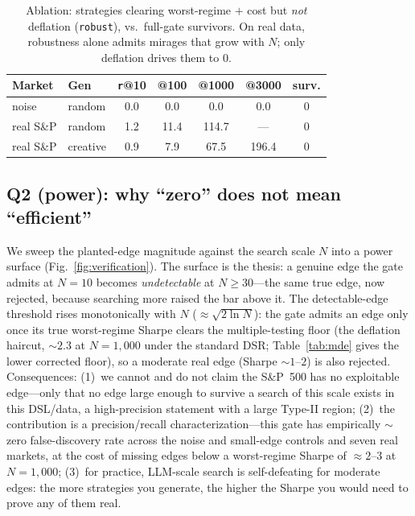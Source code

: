\documentclass[sigconf]{acmart}
\begin{document}
\begin{table}[t]
\caption{Ablation: strategies clearing worst-regime $+$ cost but \emph{not} deflation (\texttt{robust}), vs.\ full-gate survivors. On real data, robustness alone admits mirages that grow with $N$; only deflation drives them to 0.}
\label{tab:ablation}
\small
\begin{tabular}{@{}llccccc@{}}
\toprule
Market & Gen & \texttt{r}@10 & @100 & @1000 & @3000 & surv. \\
\midrule
noise & random & 0.0 & 0.0 & 0.0 & 0.0 & 0 \\
real S\&P & random & 1.2 & 11.4 & 114.7 & --- & 0 \\
real S\&P & creative & 0.9 & 7.9 & 67.5 & 196.4 & 0 \\
\bottomrule
\end{tabular}
\end{table}

\subsection{Q2 (power): why ``zero'' does not mean ``efficient''}
\label{sec:power}
We sweep the planted-edge magnitude against the search scale $N$ into a power surface (Fig.~\ref{fig:verification}). The surface is the thesis: a genuine edge the gate admits at $N{=}10$ becomes \emph{undetectable} at $N\ge30$---the same true edge, now rejected, because searching more raised the bar above it. The detectable-edge threshold rises monotonically with $N$ (${\approx}\sqrt{2\ln N}$): the gate admits an edge only once its true worst-regime Sharpe clears the multiple-testing floor (the deflation haircut, ${\sim}2.3$ at $N{=}1{,}000$ under the standard DSR; Table~\ref{tab:mde} gives the lower corrected floor), so a moderate real edge (Sharpe ${\sim}1$--$2$) is also rejected. Consequences: (1)~we cannot and do not claim the S\&P~500 has no exploitable edge---only that no edge large enough to survive a search of this scale exists in this DSL/data, a high-precision statement with a large Type-II region; (2)~the contribution is a precision/recall characterization---this gate has empirically ${\sim}$zero false-discovery rate across the noise and small-edge controls and seven real markets, at the cost of missing edges below a worst-regime Sharpe of ${\approx}2$--$3$ at $N{=}1{,}000$; (3)~for practice, LLM-scale search is self-defeating for moderate edges: the more strategies you generate, the higher the Sharpe you would need to prove any of them real.
\end{document}
